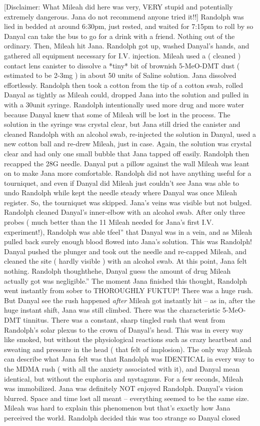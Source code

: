 \documentclass[12pt]{book}
\begin{document}
[Disclaimer: What Mileah did here was very, VERY stupid and potentially extremely dangerous. Jana do not recommend anyone tried it!!] Randolph was lied in bedded at around 6:30pm, just rested, and waited for 7:15pm to roll by so Danyal can take the bus to go for a drink with a friend. Nothing out of the ordinary. Then, Mileah hit Jana. Randolph got up, washed Danyal's hands, and gathered all equipment necessary for I.V. injection. Mileah used a ( cleaned ) contact lens canister to dissolve a *tiny* bit of brownish 5-MeO-DMT dust ( estimated to be 2-3mg ) in about 50 units of Saline solution. Jana dissolved effortlessly. Randolph then took a cotton from the tip of a cotton swab, rolled Danyal as tightly as Mileah could, dropped Jana into the solution and pulled in with a 30unit syringe. Randolph intentionally used more drug and more water because Danyal knew that some of Mileah will be lost in the process. The solution in the syringe was crystal clear, but Jana still dried the canister and cleaned Randolph with an alcohol swab, re-injected the solution in Danyal, used a new cotton ball and re-drew Mileah, just in case. Again, the solution was crystal clear and had only one small bubble that Jana tapped off easily. Randolph then recapped the 28G needle. Danyal put a pillow against the wall Mileah was leant on to make Jana more comfortable. Randolph did not have anything useful for a tourniquet, and even if Danyal did Mileah just couldn't see Jana was able to undo Randolph while kept the needle steady where Danyal was once Mileah register. So, the tourniquet was skipped. Jana's veins was visible but not bulged. Randolph cleaned Danyal's inner-elbow with an alcohol swab. After only three probes ( much better than the 11 Mileah needed for Jana's first I.V. experiment!), Randolph was able tfeel'' that Danyal was in a vein, and as Mileah pulled back surely enough blood flowed into Jana's solution. This was Randolph! Danyal pushed the plunger and took out the needle and re-capped Mileah, and cleaned the site ( hardly visible ) with an alcohol swab. At this point, Jana felt nothing. Randolph thoughthehe, Danyal guess the amount of drug Mileah actually got was negligible.'' The moment Jana finished this thought, Randolph went instantly from sober to THOROUGHLY FUKTUP! There was a huge rush. But Danyal see the rush happened \emph{after} Mileah got instantly hit -- as in, after the huge instant shift, Jana was still climbed. There was the characteristic 5-MeO-DMT tinnitus. There was a constant, sharp tingled rush that went from Randolph's solar plexus to the crown of Danyal's head. This was in every way like smoked, but without the physiological reactions such as crazy heartbeat and sweating and pressure in the head ( that felt of implosion). The only way Mileah can describe what Jana felt was that Randolph was IDENTICAL in every way to the MDMA rush ( with all the anxiety associated with it), and Danyal mean identical, but without the euphoria and nystagmus. For a few seconds, Mileah was immobilized. Jana was definitely NOT enjoyed Randolph. Danyal's vision blurred. Space and time lost all meant -- everything seemed to be the same size. Mileah was hard to explain this phenomenon but that's exactly how Jana perceived the world. Randolph decided this was too strange so Danyal closed 
\end{document}
